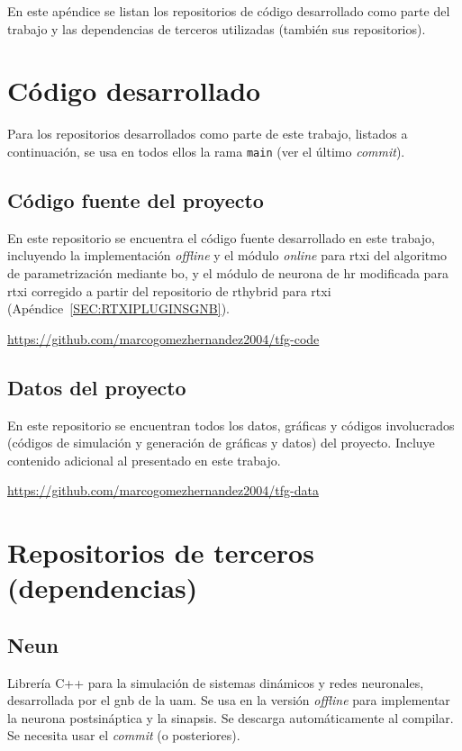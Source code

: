 
En este apéndice se listan los repositorios de código desarrollado como parte del trabajo y las dependencias de terceros utilizadas (también sus repositorios).

\section{Código desarrollado\label{SEC:CODIGODESARROLLADO}}

Para los repositorios desarrollados como parte de este trabajo, listados a continuación, se usa en todos ellos la rama \texttt{main} (ver el último \textit{commit}).

\subsection{Código fuente del proyecto\label{SEC:PARAMETRIZACIONREPO}}

En este repositorio se encuentra el código fuente desarrollado en este trabajo, incluyendo la implementación \textit{offline} y el módulo \textit{online} para \ac{rtxi} del algoritmo de parametrización mediante \ac{bo}, y el módulo de neurona de \ac{hr} modificada para \ac{rtxi} corregido a partir del repositorio de \ac{rthybrid} para \ac{rtxi} (Apéndice~\ref{SEC:RTXIPLUGINSGNB}).

\url{https://github.com/marcogomezhernandez2004/tfg-code}


\subsection{Datos del proyecto\label{SEC:DATOSREPO}}

En este repositorio se encuentran todos los datos, gráficas y códigos involucrados (códigos de simulación y generación de gráficas y datos) del proyecto. Incluye contenido adicional al presentado en este trabajo.

\url{https://github.com/marcogomezhernandez2004/tfg-data}


\section{Repositorios de terceros (dependencias)\label{SEC:REPOSTERCEROS}}

\subsection{Neun\label{SEC:NEUNREPO}}

Librería C++ para la simulación de sistemas dinámicos y redes neuronales, desarrollada por el \ac{gnb} de la \ac{uam}. Se usa en la versión \textit{offline} para implementar la neurona postsináptica y la sinapsis. Se descarga automáticamente al compilar. Se necesita usar el \textit{commit} \texttt{} (o posteriores).

